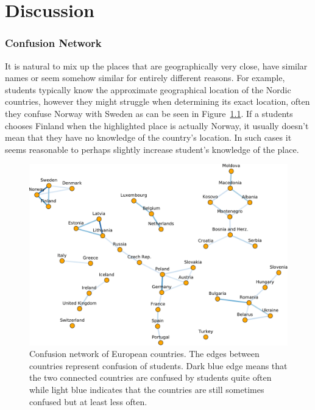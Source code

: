 \chapter{Discussion}

\subsection{Confusion Network}

It is natural to mix up the places that are geographically very close, have similar names or seem somehow similar for entirely different reasons. For example, students typically know the approximate geographical location of the Nordic countries, however they might struggle when determining its exact location, often they confuse Norway with Sweden as can be seen in Figure~\ref{fig:confusion-network}. If a students chooses Finland when the highlighted place is actually Norway, it usually doesn't mean that they have no knowledge of the country's location. In such cases it seems reasonable to perhaps slightly increase student's knowledge of the place.

\begin{figure}[htbp]
  \centering
  \includegraphics[width=\textwidth]{img/confusion-network}
  \caption{Confusion network of European countries. The edges between countries represent confusion of students. Dark blue edge means that the two connected countries are confused by students quite often while light blue indicates that the countries are still sometimes confused but at least less often.}
  \label{fig:confusion-network}
\end{figure}
